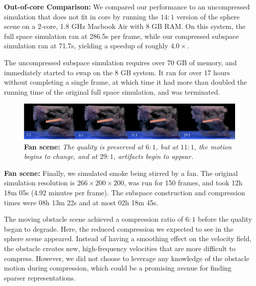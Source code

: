 \noindent \textbf{Out-of-core Comparison:} We compared our performance to an uncompressed simulation that does not fit in core by running the $14 : 1$ version of the sphere scene on a 2-core, 1.8 GHz Macbook Air with 8 GB RAM. On this system, the full space simulation ran at 286.5s per frame, while our compressed subspace simulation ran at 71.7s, yielding a speedup of roughly $4.0\times$.

The uncompressed subspace simulation requires over 70 GB of memory, and immediately started to swap on the 8 GB system. It ran for over 17 hours without completing a single frame, at which time it had more than doubled the running time of the original full space simulation, and was terminated.

\begin{figure}[t]
\includegraphics[width= \columnwidth]{chap4/figures/fan_sidebyside.png}
\caption{\textbf{Fan scene:} {\em The quality is preserved at $6:1$, but at $11:1$, the motion begins to change, and at $29:1$, artifacts begin to appear.}}
\label{fig:fanComparison}
\end{figure}
\noindent \textbf{Fan scene:} Finally, we simulated smoke being stirred by a fan. The original simulation resolution is $266 \times 200 \times 200$, was run for 150 frames, and took 12h 18m 05s (4.92 minutes per frame). The subspace construction and compression times were 08h 13m 22s and at most 02h 18m 45s.

The moving obstacle scene achieved a compression ratio of $6:1$ before the quality began to degrade. Here, the reduced compression we expected to see in the sphere scene appeared. Instead of having a smoothing effect on the velocity field, the obstacle creates new, high-frequency velocities that are more difficult to compress. However, we did not choose to leverage any knowledge of the obstacle motion during compression, which could be a promising avenue for finding sparser representations.


